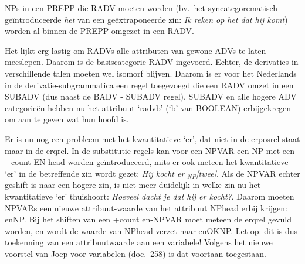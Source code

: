 NPs in een PREPP die RADV moeten worden (bv.\  het 
syncategorematisch ge\"{i}ntro\-duceerde {\em het\/} van een ge\"{e}xtraponeerde 
zin: {\em Ik reken op het dat hij komt\/}) worden al binnen de PREPP omgezet 
in een RADV.

Het lijkt erg lastig om RADVs alle attributen van gewone ADVs te laten 
meeslepen. Daarom is de basiscategorie RADV ingevoerd. Echter, de derivaties in 
verschillende talen moeten wel isomorf blijven. Daarom is er voor het 
Nederlands in de derivatie-subgrammatica een regel toegevoegd die een RADV 
omzet in een SUBADV (dus naast de BADV - SUBADV regel). SUBADV en alle hogere 
ADV categorie\"{e}n hebben nu het 
attribuut `radvb' (`b' van BOOLEAN) erbijgekregen om aan te geven wat hun hoofd 
is.

Er is nu nog een probleem met het kwantitatieve `er', dat niet in de erposrel 
staat maar in de erqrel. In de substitutie-regels kan voor een NPVAR 
een NP met een +count EN head worden ge\"{i}ntroduceerd, mits er ook meteen 
het kwantitatieve `er' in de betreffende zin wordt gezet:
{\em Hij kocht er $_{NP}$[twee]\/}. Als de NPVAR echter geshift is naar een 
hogere zin,
is niet meer duidelijk in welke zin nu het kwantitatieve `er' 
thuishoort: {\em Hoeveel dacht je dat hij er kocht?\/}. Daarom moeten NPVARs 
een nieuwe attribuut-waarde van het attribuut NPhead
erbij krijgen: enNP. Bij het shiften van een +count en-NPVAR moet meteen de 
erqrel gevuld worden, en wordt de waarde van NPhead verzet naar enOKNP.
Let op: dit is dus toekenning van een 
attribuutwaarde aan een variabele! Volgens het nieuwe voorstel van Joep 
voor variabelen (doc.\ 258) is dat voortaan toegestaan.



